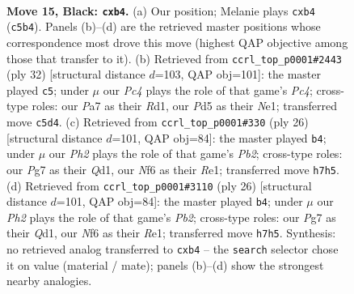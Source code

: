 \documentclass[11pt]{article}
\begin{document}
\clearpage

\begin{figure}[p]\centering
\begin{subfigure}{0.46\textwidth}\centering
\resizebox{\linewidth}{!}{%
\newchessgame
\chessboard[
  setfen={rnb1kr2/p3b1pp/1p1q1n2/2pp1p2/1P1P3P/P3PNPB/4QP2/RNB1R1K1 b - - 0 15},
  showmover=false,
  pgfstyle=straightmove, color=movearrow, markmove={c5-b4}
]}
\caption{}
\end{subfigure}\hfill
\begin{subfigure}{0.46\textwidth}\centering
\resizebox{\linewidth}{!}{%
\newchessgame
\chessboard[
  setfen={r1bqr1k1/5pp1/1pn2n1p/p2p4/2PPp3/R1N1P2P/1P1QBPP1/3RN1K1 w - - 0 17},
  showmover=false,
  pgfstyle=straightmove, color=movearrow, markmove={c4-c5}
]}
\caption{}
\end{subfigure}
\\[4pt]
\begin{subfigure}{0.46\textwidth}\centering
\resizebox{\linewidth}{!}{%
\newchessgame
\chessboard[
  setfen={rn1qrbk1/1bp2p1p/p2p1np1/1p2p3/3PP3/P1P2N1P/1PBN1PP1/R1BQR1K1 w - - 1 14},
  showmover=false,
  pgfstyle=straightmove, color=movearrow, markmove={b2-b4}
]}
\caption{}
\end{subfigure}\hfill
\begin{subfigure}{0.46\textwidth}\centering
\resizebox{\linewidth}{!}{%
\newchessgame
\chessboard[
  setfen={rn1qrbk1/1bp2p1p/p2p1np1/1p2p3/3PP3/P1P2N1P/1PBN1PP1/R1BQR1K1 w - - 1 14},
  showmover=false,
  pgfstyle=straightmove, color=movearrow, markmove={b2-b4}
]}
\caption{}
\end{subfigure}
\caption{\textbf{Move 15, Black: \texttt{cxb4}.} (a) Our position; Melanie plays \texttt{cxb4} (\texttt{c5b4}). Panels (b)--(d) are the retrieved master positions whose correspondence most drove this move (highest QAP objective among those that transfer to it). (b) Retrieved from \texttt{ccrl\_top\_p0001\#2443} (ply 32) [structural distance $d$=103, QAP obj=101]: the master played \texttt{c5}; under $\mu$ our \emph{Pc4} plays the role of that game's \emph{Pc4}; cross-type roles: our \emph{P}a7 as their \emph{R}d1, our \emph{P}d5 as their \emph{N}e1; transferred move \texttt{c5d4}. (c) Retrieved from \texttt{ccrl\_top\_p0001\#330} (ply 26) [structural distance $d$=101, QAP obj=84]: the master played \texttt{b4}; under $\mu$ our \emph{Ph2} plays the role of that game's \emph{Pb2}; cross-type roles: our \emph{P}g7 as their \emph{Q}d1, our \emph{N}f6 as their \emph{R}e1; transferred move \texttt{h7h5}. (d) Retrieved from \texttt{ccrl\_top\_p0001\#3110} (ply 26) [structural distance $d$=101, QAP obj=84]: the master played \texttt{b4}; under $\mu$ our \emph{Ph2} plays the role of that game's \emph{Pb2}; cross-type roles: our \emph{P}g7 as their \emph{Q}d1, our \emph{N}f6 as their \emph{R}e1; transferred move \texttt{h7h5}. Synthesis: no retrieved analog transferred to \texttt{cxb4} -- the \texttt{search} selector chose it on value (material / mate); panels (b)--(d) show the strongest nearby analogies.}
\label{fig:thought-m29}
\end{figure}
\end{document}
